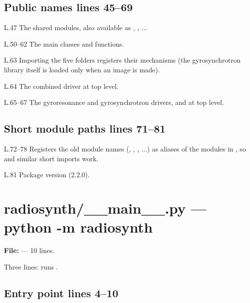 \section*{\normalsize Public names \hfill{\small\mdseries\color{gray}lines 45--69}}

\begin{lines}
\item[L.47] The shared modules, also available as , , ...
\item[L.50–62] The main classes and functions.
\item[L.63] Importing the five folders registers their mechanisms (the gyrosynchrotron library itself is loaded only when an image is made).
\item[L.64] The combined driver at top level.
\item[L.65–67] The gyroresonance and gyrosynchrotron drivers,  and  at top level.
\end{lines}
\section*{\normalsize Short module paths \hfill{\small\mdseries\color{gray}lines 71--81}}

\begin{lines}
\item[L.72–78] Registers the old module names (, , , ...) as aliases of the modules in , so  and similar short imports work.
\item[L.81] Package version (2.2.0).
\end{lines}

\chapter{radiosynth/\_\_main\_\_.py --- python -m radiosynth}
\label{mod:main.py}
\textbf{File:}  --- 10 lines.

Three lines: runs .

\section*{\normalsize Entry point \hfill{\small\mdseries\color{gray}lines 4--10}}

